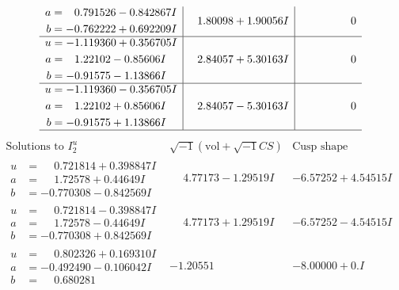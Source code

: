\documentclass[1p]{elsarticle_modified}
\theoremstyle{definition}
\newcommand{\I}{\sqrt{-1}}
\begin{document}
$$\begin{array}{c|c|c}
\begin{aligned}
a &= \phantom{-}0.791526 - 0.842867 I \\
b &= -0.762222 + 0.692209 I\end{aligned}
 & \phantom{-}1.80098 + 1.90056 I & \phantom{-0.000000 } 0 \\ \hline\begin{aligned}
u &= -1.119360 + 0.356705 I \\
a &= \phantom{-}1.22102 - 0.85606 I \\
b &= -0.91575 - 1.13866 I\end{aligned}
 & \phantom{-}2.84057 + 5.30163 I & \phantom{-0.000000 } 0 \\ \hline\begin{aligned}
u &= -1.119360 - 0.356705 I \\
a &= \phantom{-}1.22102 + 0.85606 I \\
b &= -0.91575 + 1.13866 I\end{aligned}
 & \phantom{-}2.84057 - 5.30163 I & \phantom{-0.000000 } 0\\
 \hline 
 \end{array}$$\newpage$$\begin{array}{c|c|c}  
\text{Solutions to }I^u_{2}& \I (\text{vol} + \sqrt{-1}CS) & \text{Cusp shape}\\
 \hline 
\begin{aligned}
u &= \phantom{-}0.721814 + 0.398847 I \\
a &= \phantom{-}1.72578 + 0.44649 I \\
b &= -0.770308 - 0.842569 I\end{aligned}
 & \phantom{-}4.77173 - 1.29519 I & -6.57252 + 4.54515 I \\ \hline\begin{aligned}
u &= \phantom{-}0.721814 - 0.398847 I \\
a &= \phantom{-}1.72578 - 0.44649 I \\
b &= -0.770308 + 0.842569 I\end{aligned}
 & \phantom{-}4.77173 + 1.29519 I & -6.57252 - 4.54515 I \\ \hline\begin{aligned}
u &= \phantom{-}0.802326 + 0.169310 I \\
a &= -0.492490 - 0.106042 I \\
b &= \phantom{-}0.680281\phantom{ +0.000000I}\end{aligned}
 & -1.20551\phantom{ +0.000000I} & -8.00000 + 0. I\phantom{ +0.000000I} \\ \hline\begin{aligned}

\end{aligned}
\end{array}$$
\end{document}
